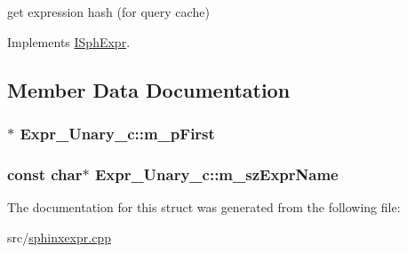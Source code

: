 get expression hash (for query cache) 



Implements \hyperlink{structISphExpr_aabc4c95ac6f190f6ebb15fabd7e54b08}{I\-Sph\-Expr}.



\subsection{Member Data Documentation}
\hypertarget{structExpr__Unary__c_a247f8d41a5512b0e0c48ac787d01821b}{
\subsubsection[{m\-\_\-p\-First}]{$\ast$ Expr\-\_\-\-Unary\-\_\-c\-::m\-\_\-p\-First}}\label{structExpr__Unary__c_a247f8d41a5512b0e0c48ac787d01821b}
\hypertarget{structExpr__Unary__c_a31a91fe856d78608308b680868756c26}{
\subsubsection[{m\-\_\-sz\-Expr\-Name}]{\setlength{\rightskip}{0pt plus 5cm}const char$\ast$ Expr\-\_\-\-Unary\-\_\-c\-::m\-\_\-sz\-Expr\-Name}}\label{structExpr__Unary__c_a31a91fe856d78608308b680868756c26}


The documentation for this struct was generated from the following file\-:\begin{DoxyCompactItemize}
\item 
src/\hyperlink{sphinxexpr_8cpp}{sphinxexpr.\-cpp}\end{DoxyCompactItemize}
